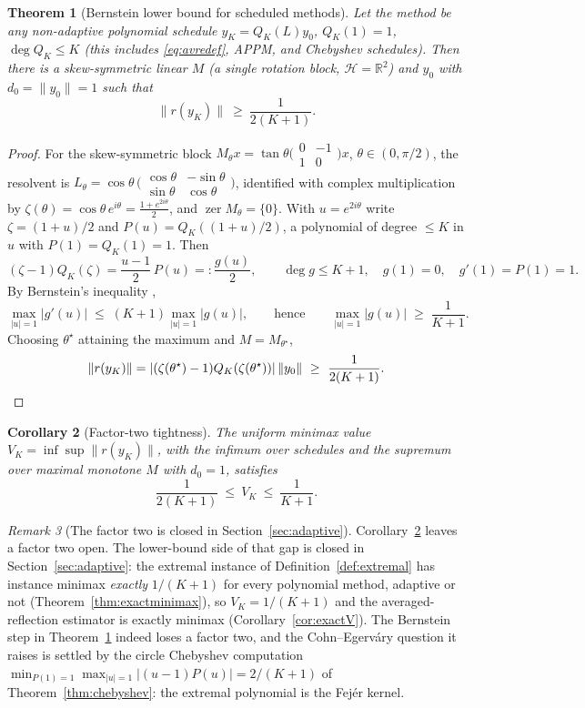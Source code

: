 \documentclass[11pt]{article}
\newtheorem{theorem}{Theorem}[section]
\newtheorem{corollary}[theorem]{Corollary}
\theoremstyle{definition}
\theoremstyle{remark}
\newtheorem{remark}[theorem]{Remark}
\DeclareMathOperator{\zer}{zer}
\newcommand{\Hh}{\mathcal{H}}
\newcommand{\R}{\mathbb{R}}
\newcommand{\norm}[1]{\| #1 \|}
\newcommand{\abs}[1]{| #1 |}
\begin{document}
\begin{theorem}[Bernstein lower bound for scheduled methods]\label{thm:bernstein}
Let the method be any non-adaptive polynomial schedule
$y_K=Q_K(L)y_0$, $Q_K(1)=1$, $\deg Q_K\le K$ (this includes
\eqref{eq:avredef}, APPM, and Chebyshev schedules). Then there is a
skew-symmetric linear $M$ (a single rotation block, $\Hh=\R^2$) and $y_0$
with $d_0=\norm{y_0}=1$ such that
\begin{equation}
\norm{r(y_K)}\ \ge\ \frac{1}{2(K+1)} .
\end{equation}
\end{theorem}
\begin{proof}
For the skew-symmetric block $M_\theta x=\tan\theta
\big(\begin{smallmatrix}0&-1\\1&0\end{smallmatrix}\big)x$,
$\theta\in(0,\pi/2)$, the resolvent is $L_\theta=\cos\theta\,
\big(\begin{smallmatrix}\cos\theta&-\sin\theta\\\sin\theta&\cos\theta
\end{smallmatrix}\big)$, identified with complex multiplication by
$\zeta(\theta)=\cos\theta\,e^{i\theta}=\frac{1+e^{2i\theta}}2$, and
$\zer M_\theta=\{0\}$. With $u=e^{2i\theta}$ write
$\zeta=(1+u)/2$ and $P(u)=Q_K((1+u)/2)$, a polynomial of degree $\le K$ in
$u$ with $P(1)=Q_K(1)=1$. Then
\[
(\zeta-1)Q_K(\zeta)=\frac{u-1}{2}\,P(u)=:\frac{g(u)}2,\qquad
\deg g\le K+1,\quad g(1)=0,\quad g'(1)=P(1)=1.
\]
By Bernstein's inequality
\cite[Ch.~14]{rahman2002analytic},
\[
\max_{\abs{u}=1}\abs{g'(u)}\;\le\;(K+1)\max_{\abs{u}=1}\abs{g(u)},
\qquad\text{hence}\qquad
\max_{\abs{u}=1}\abs{g(u)}\;\ge\;\frac{1}{K+1}.
\]
Choosing $\theta^\star$ attaining
the maximum and $M=M_{\theta^\star}$,
\[
\norm{r(y_K)}=\abs{(\zeta(\theta^\star)-1)Q_K(\zeta(\theta^\star))}\,
\norm{y_0}\ \ge\ \frac{1}{2(K+1)}. \qedhere
\]
\end{proof}

\begin{corollary}[Factor-two tightness]\label{cor:fact2}
The uniform minimax value $V_K=\inf\sup\norm{r(y_K)}$, with the infimum
over schedules and the supremum over maximal monotone $M$ with $d_0=1$,
satisfies
\[
\frac{1}{2(K+1)}\ \le\ V_K\ \le\ \frac{1}{K+1}.
\]
\end{corollary}

\begin{remark}[The factor two is closed in Section~\ref{sec:adaptive}]
\label{rem:fact2closed}
Corollary~\ref{cor:fact2} leaves a factor two open. The lower-bound side
of that gap is closed in Section~\ref{sec:adaptive}: the extremal instance
of Definition~\ref{def:extremal} has instance minimax \emph{exactly}
$1/(K+1)$ for every polynomial method, adaptive or not
(Theorem~\ref{thm:exactminimax}), so $V_K=1/(K+1)$ and the
averaged-reflection estimator is exactly minimax
(Corollary~\ref{cor:exactV}). The Bernstein step in
Theorem~\ref{thm:bernstein} indeed loses a factor two, and the Cohn--Egerv\'ary
question it raises is settled by the circle Chebyshev computation
$\min_{P(1)=1}\max_{\abs u=1}\abs{(u-1)P(u)}=2/(K+1)$ of
Theorem~\ref{thm:chebyshev}: the extremal polynomial is the Fej\'er
kernel.
\end{remark}
\end{document}
